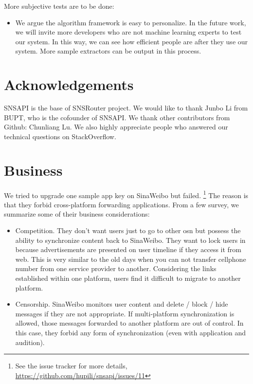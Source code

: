 \documentclass{sig-alternate}
\begin{document}
More subjective tests are to be done:

\begin{itemize}
	\item We argue the algorithm framework is easy to personalize. 
		In the future work, we will invite more developers 
		who are not machine learning experts to test our system. 
		In this way, we can see how efficient people are 
		after they use our system. 
		More sample extractors can be output in this process. 
\end{itemize}

\section*{Acknowledgements}
\label{sec:Acknowledgements}

SNSAPI is the base of SNSRouter project. 
We would like to thank Junbo Li from BUPT, who is the cofounder of SNSAPI.  
We thank other contributors from Github: Chunliang Lu. 
We also highly appreciate people who answered our technical questions on StackOverflow. 




\appendix 


\section{Business}
\label{sec:Business}

We tried to upgrade one sample app key on SinaWeibo but failed.
\footnote{See the issue tracker for more details, \url{https://github.com/hupili/snsapi/issues/11}}
The reason is that they forbid cross-platform forwarding applications. 
From a few survey, we summarize some of their business considerations:
\begin{itemize}
	\item Competition. 
		They don't want users just to go to other \gls{osn} but possess 
		the ability to synchronize content back to SinaWeibo.
		They want to lock users in because advertisements are presented on user timeline
		if they access it from web. 
		This is very similar to the old days when you can not 
		transfer cellphone number from one service provider to another. 
		Considering the links established within one platform, 
		users find it difficult to migrate to another platform. 
	\item Censorship. 
		SinaWeibo monitors user content and delete / block / hide messages 
		if they are not appropriate. 
		If multi-platform synchronization is allowed, those messages 
		forwarded to another platform are out of control. 
		In this case, they forbid any form of synchronization
		(even with application and audition). 
\end{itemize}
\end{document}
